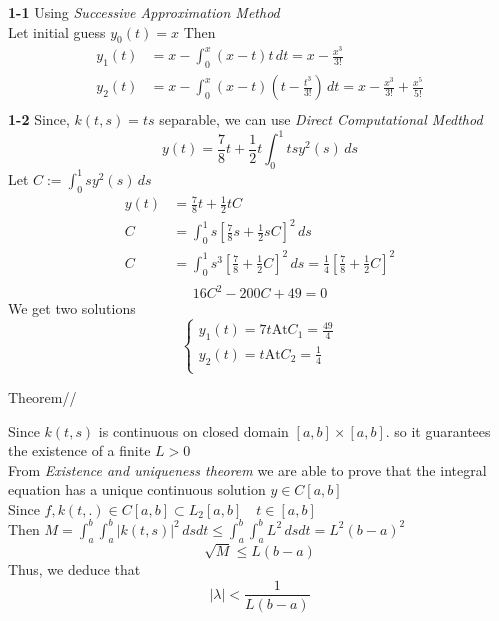 \documentclass[]{article}
\begin{document}
\textbf{1-1}
Using \textit{Successive Approximation Method}\\
Let initial guess $y_0(t) =x$ Then
\begin{align*}
    y_1(t) & = x -\int_0^x (x-t)t \, dt = x-\frac{x^3}{3!}                                \\
    y_2(t) & = x -\int_0^x (x-t)(t-\frac{t^3}{3!})\, dt = x-\frac{x^3}{3!}+\frac{x^5}{5!} \\
\end{align*}
\textbf{1-2}
Since, $k(t,s)=ts$ separable, we can use \textit{Direct Computational Medthod}\\
\begin{equation*}
    y(t) = \frac{7}{8}t + \frac{1}{2}t \int_0^1 ts y^2(s) \, ds
\end{equation*}
Let $C:=\int_0^1 s y^2(s) \, ds$
\begin{align*}
    y(t) & = \frac{7}{8}t + \frac{1}{2}tC                                                                                       \\
    C    & = \int_0^1 s \left[\frac{7}{8}s + \frac{1}{2}sC\right]^2 \,ds                                                        \\
    C    & = \int_0^1 s^3 \left[\frac{7}{8} + \frac{1}{2}C\right]^2 \,ds = \frac{1}{4}\left[\frac{7}{8} + \frac{1}{2}C\right]^2 \\
\end{align*}
\begin{equation*}
    16C^2 -200C+49=0
\end{equation*}
We get two solutions
\[
    \begin{cases}
        y_1(t) = 7t \text{At} C_1 = \frac{49}{4} \\
        y_2(t) = t \text{At} C_2 = \frac{1}{4}   \\
    \end{cases}    
\]

Theorem//

Since $k(t,s)$ is continuous on closed domain $[a,b]\times[a,b]$. so it guarantees the existence of a finite  $L>0$\\
From \textit{Existence and uniqueness theorem} we are able to prove that the integral equation has a unique continuous solution $y\in C[a,b]$\\
Since $f,k(t,.) \in C[a,b] \subset L_2[a,b] \quad t \in [a,b]$\\
Then $M = \int_a^b \int_a^b |k(t,s)|^2 \, ds dt \leq \int_a^b \int_a^b L^2 \, ds dt = L^2 (b-a)^2 $\\
$$\sqrt{M} \leq L(b-a)$$
Thus, we deduce that
$$|\lambda| < \frac{1}{L(b-a)}$$

\end{document}
